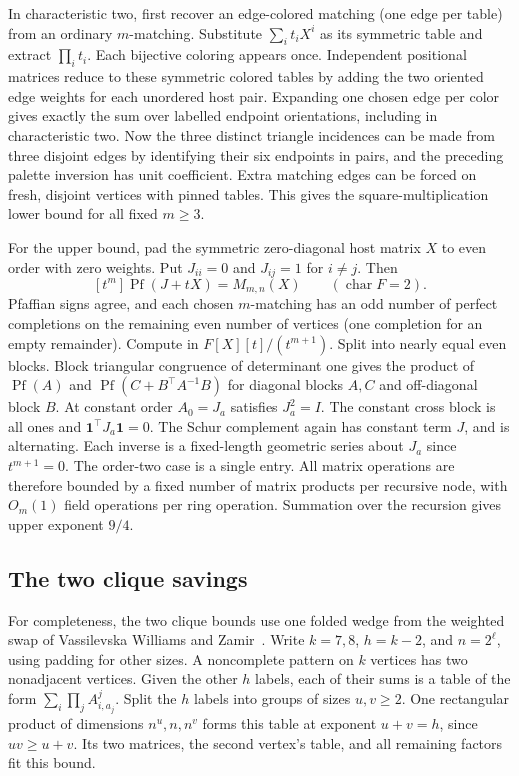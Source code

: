 \documentclass[11pt,letterpaper]{article}
\begin{document}
In characteristic two, first recover an edge-colored matching (one edge per table) from an ordinary \(m\)-matching. Substitute \(\sum_i t_iX^i\) as its symmetric table and extract \(\prod_i t_i\). Each bijective coloring appears once. Independent positional matrices reduce to these symmetric colored tables by adding the two oriented edge weights for each unordered host pair. Expanding one chosen edge per color gives exactly the sum over labelled endpoint orientations, including in characteristic two. Now the three distinct triangle incidences can be made from three disjoint edges by identifying their six endpoints in pairs, and the preceding palette inversion has unit coefficient. Extra matching edges can be forced on fresh, disjoint vertices with pinned tables. This gives the square-multiplication lower bound for all fixed \(m\ge3\).

For the upper bound, pad the symmetric zero-diagonal host matrix \(X\) to even order with zero weights. Put \(J_{ii}=0\) and \(J_{ij}=1\) for \(i\ne j\). Then
\[
              [t^m]\operatorname{Pf}(J+tX)=M_{m,n}(X)
              \qquad(\operatorname{char}F=2).
\]
Pfaffian signs agree, and each chosen \(m\)-matching has an odd number of perfect completions on the remaining even number of vertices (one completion for an empty remainder). Compute in \(F[X][t]/(t^{m+1})\). Split into nearly equal even blocks. Block triangular congruence of determinant one gives the product of \(\operatorname{Pf}(A)\) and \(\operatorname{Pf}(C+B^\top A^{-1}B)\) for diagonal blocks \(A,C\) and off-diagonal block \(B\). At constant order \(A_0=J_a\) satisfies \(J_a^2=I\). The constant cross block is all ones and \(\mathbf1^\top J_a\mathbf1=0\). The Schur complement again has constant term \(J\), and is alternating. Each inverse is a fixed-length geometric series about \(J_a\) since \(t^{m+1}=0\). The order-two case is a single entry. All matrix operations are therefore bounded by a fixed number of matrix products per recursive node, with \(O_m(1)\) field operations per ring operation. Summation over the recursion gives upper exponent \(9/4\).

\subsection{The two clique savings}\label{the-two-clique-savings}

For completeness, the two clique bounds use one folded wedge from the weighted swap of Vassilevska Williams and Zamir~\cite[Lemmas~3.1--3.3]{vw-zamir}. Write \(k=7,8\), \(h=k-2\), and \(n=2^\ell\), using padding for other sizes. A noncomplete pattern on \(k\) vertices has two nonadjacent vertices. Given the other \(h\) labels, each of their sums is a table of the form \(\sum_i\prod_j A^j_{i,a_j}\). Split the \(h\) labels into groups of sizes \(u,v\ge2\). One rectangular product of dimensions \(n^u,n,n^v\) forms this table at exponent \(u+v=h\), since \(uv\ge u+v\). Its two matrices, the second vertex's table, and all remaining factors fit this bound.
\end{document}
